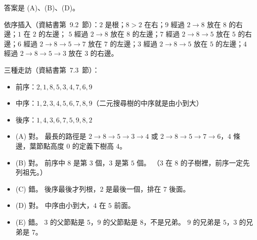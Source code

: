 \begin{pastsoln}
答案是 (A)、(B)、(D)。

依序插入（資結書第~9.2~節）：$2$ 是根；$8 > 2$ 在右；$9$ 經過 $2 \to 8$ 放在 $8$ 的右邊；$1$ 在 $2$ 的左邊；
$5$ 經過 $2 \to 8$ 放在 $8$ 的左邊；$7$ 經過 $2 \to 8 \to 5$ 放在 $5$ 的右邊；$6$ 經過 $2 \to 8 \to 5 \to 7$ 放在
$7$ 的左邊；$3$ 經過 $2 \to 8 \to 5$ 放在 $5$ 的左邊；$4$ 經過 $2 \to 8 \to 5 \to 3$ 放在 $3$ 的右邊。
\begin{center}
\end{center}
三種走訪（資結書第~7.3~節）：
\begin{itemize}
\item 前序：$2, 1, 8, 5, 3, 4, 7, 6, 9$
\item 中序：$1, 2, 3, 4, 5, 6, 7, 8, 9$（二元搜尋樹的中序就是由小到大）
\item 後序：$1, 4, 3, 6, 7, 5, 9, 8, 2$
\end{itemize}

\begin{itemize}
\item (A) 對。 最長的路徑是 $2 \to 8 \to 5 \to 3 \to 4$ 或 $2 \to 8 \to 5 \to 7 \to 6$，$4$ 條邊，葉節點高度 $0$ 的定義下樹高 $4$。
\item (B) 對。 前序中 $8$ 是第 $3$ 個，$3$ 是第 $5$ 個。 （$3$ 在 $8$ 的子樹裡，前序一定先列祖先。）
\item (C) 錯。 後序最後才列根，$2$ 是最後一個，排在 $7$ 後面。
\item (D) 對。 中序由小到大，$4$ 在 $5$ 前面。
\item (E) 錯。 $3$ 的父節點是 $5$，$9$ 的父節點是 $8$，不是兄弟。 $9$ 的兄弟是 $5$，$3$ 的兄弟是 $7$。
\end{itemize}
\end{pastsoln}
